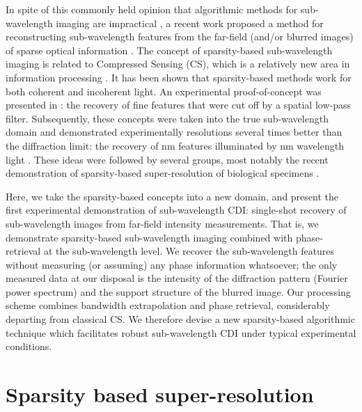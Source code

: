 In spite of this commonly held opinion that algorithmic methods for
sub-wavelength imaging are impractical , a
recent work proposed a method for reconstructing sub-wavelength
features from the far-field (and/or blurred images) of sparse optical
information . The concept of
sparsity-based sub-wavelength imaging is related to Compressed Sensing
(CS), which is a relatively new area in information processing
.
It has been shown that sparsity-based methods work for both coherent
 and incoherent
 light. An
experimental proof-of-concept was presented in
: the recovery of fine features that
were cut off by a spatial low-pass filter. Subsequently, these
concepts were taken into the true sub-wavelength domain and
demonstrated experimentally resolutions several times better than the
diffraction limit: the recovery of \unit[100]{nm} features illuminated
by \unit[532]{nm}
wavelength light . These ideas were followed
by several groups, most notably the recent demonstration of
sparsity-based super-resolution of biological specimens
.

Here, we take the sparsity-based concepts into a new domain, and
present the first experimental demonstration of sub-wavelength CDI:
single-shot recovery of sub-wavelength images from far-field intensity
measurements.  That is, we demonstrate sparsity-based sub-wavelength
imaging combined with phase-retrieval at the sub-wavelength level. We
recover the sub-wavelength features without measuring (or assuming)
any phase information whatsoever; the only measured data at our
disposal is the intensity of the diffraction pattern (Fourier power
spectrum) and the support structure of the blurred image. Our
processing scheme combines bandwidth extrapolation and phase
retrieval, considerably departing from classical CS. We therefore
devise a new sparsity-based algorithmic technique which facilitates
robust sub-wavelength CDI under typical experimental conditions.

\section{Sparsity based super-resolution}
\label{sec:sparsity-based-super}


